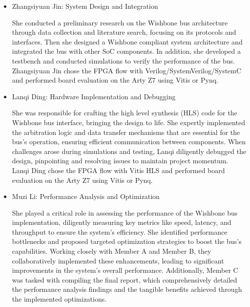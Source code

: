 \documentclass[12pt]{report}
\begin{document}
\begin{itemize}
    \item Zhangsiyuan Jin: System Design and Integration

    She conducted a preliminary research on the Wishbone bus architecture through data collection and literature search, focusing on its protocols and interfaces. Then she designed a Wishbone compliant system architecture and integrated the bus with other SoC components. In addition, she developed a testbench and conducted simulations to verify the performance of the bus. Zhangsiyuan Jin chose the FPGA flow with Verilog/SystemVerilog/SystemC and performed board evaluation on the Arty Z7 using Vitis or Pynq.

    \item Lanqi Ding: Hardware Implementation and Debugging

    She was responsible for crafting the high level synthesis (HLS) code for the Wishbone bus interface, bringing the design to life. She expertly implemented the arbitration logic and data transfer mechanisms that are essential for the bus's operation, ensuring efficient communication between components. When challenges arose during simulations and testing, Lanqi diligently debugged the design, pinpointing and resolving issues to maintain project momentum. Lanqi Ding chose the FPGA flow with Vitis HLS and performed board evaluation on the Arty Z7 using Vitis or Pynq.

    \item Muzi Li: Performance Analysis and Optimization

    She played a critical role in assessing the performance of the Wishbone bus implementation, diligently measuring key metrics like speed, latency, and throughput to ensure the system's efficiency. She identified performance bottlenecks and proposed targeted optimization strategies to boost the bus's capabilities. Working closely with Member A and Member B, they collaboratively implemented these enhancements, leading to significant improvements in the system's overall performance. Additionally, Member C was tasked with compiling the final report, which comprehensively detailed the performance analysis findings and the tangible benefits achieved through the implemented optimizations.
\end{itemize}
\end{document}
